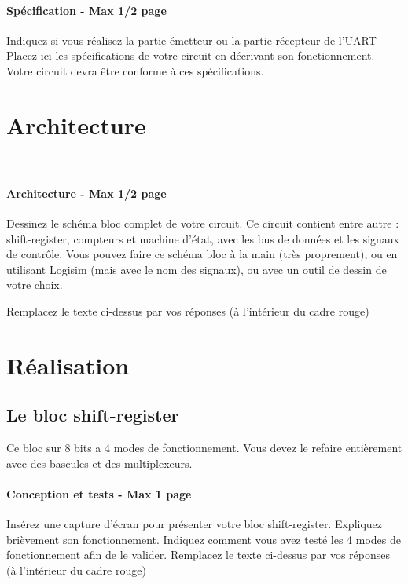 \documentclass[a4paper]{article} %
\begin{document}


\begin{tcolorbox}[colframe=Monokaimagenta,colback=white]
\paragraph %
{Spécification - Max 1/2 page } 
Indiquez si vous réalisez la partie émetteur ou la partie récepteur de l’UART
Placez ici les spécifications de votre circuit en décrivant son fonctionnement. Votre circuit devra être conforme à ces spécifications.

\end{tcolorbox}

\section{Architecture}\

\begin{tcolorbox}[colframe=Monokaimagenta,colback=white]
\paragraph{Architecture - Max 1/2 page}
Dessinez le schéma bloc complet de votre circuit. Ce circuit contient entre autre : shift-register, compteurs et machine d’état, avec les bus de données et les signaux de contrôle. Vous pouvez faire ce schéma bloc à la main (très proprement), ou en utilisant Logisim (mais avec le nom des signaux), ou avec un outil de dessin de votre choix.

Remplacez le texte ci-dessus par vos réponses (à l’intérieur du cadre rouge)\\


\end{tcolorbox}


\section {Réalisation}
\subsection{Le bloc shift-register}
Ce bloc sur 8 bits a 4 modes de fonctionnement. Vous devez le refaire entièrement avec des bascules et des multiplexeurs.
\begin{tcolorbox}[colframe=Monokaimagenta,colback=white]
\paragraph{Conception et tests - Max 1 page}
Insérez une capture d’écran pour présenter votre bloc shift-register. Expliquez brièvement son fonctionnement.
Indiquez comment vous avez testé les 4 modes de fonctionnement afin de le valider.
Remplacez le texte ci-dessus par vos réponses (à l’intérieur du cadre rouge)
\\
\end{tcolorbox}
\end{document}
